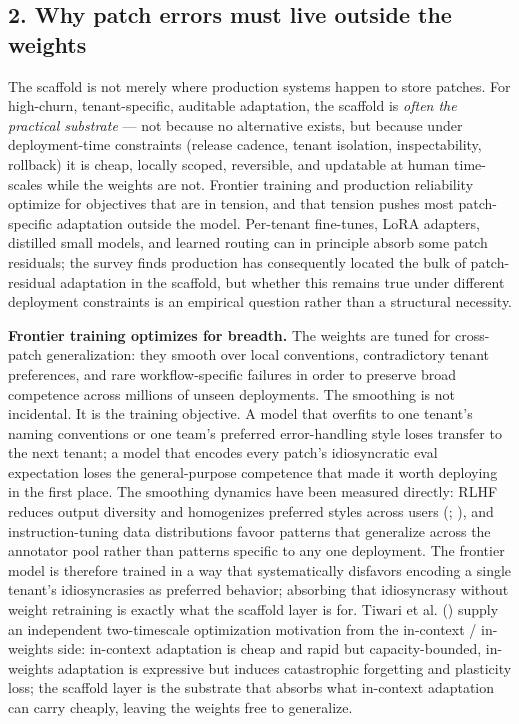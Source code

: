 \documentclass[
]{article}
\begin{document}
\subsection{2. Why patch errors must live outside the
weights}\label{why-patch-errors-must-live-outside-the-weights}

The scaffold is not merely where production systems happen to store
patches. For high-churn, tenant-specific, auditable adaptation, the
scaffold is \emph{often the practical substrate} --- not because no
alternative exists, but because under deployment-time constraints
(release cadence, tenant isolation, inspectability, rollback) it is
cheap, locally scoped, reversible, and updatable at human time-scales
while the weights are not. Frontier training and production reliability
optimize for objectives that are in tension, and that tension pushes
most patch-specific adaptation outside the model. Per-tenant fine-tunes,
LoRA adapters, distilled small models, and learned routing can in
principle absorb some patch residuals; the survey finds production has
consequently located the bulk of patch-residual adaptation in the
scaffold, but whether this remains true under different deployment
constraints is an empirical question rather than a structural necessity.

\textbf{Frontier training optimizes for breadth.} The weights are tuned
for cross-patch generalization: they smooth over local conventions,
contradictory tenant preferences, and rare workflow-specific failures in
order to preserve broad competence across millions of unseen
deployments. The smoothing is not incidental. It is the training
objective. A model that overfits to one tenant's naming conventions or
one team's preferred error-handling style loses transfer to the next
tenant; a model that encodes every patch's idiosyncratic eval
expectation loses the general-purpose competence that made it worth
deploying in the first place. The smoothing dynamics have been measured
directly: RLHF reduces output diversity and homogenizes preferred styles
across users (;
), and
instruction-tuning data distributions favoor patterns that generalize
across the annotator pool rather than patterns specific to any one
deployment. The frontier model is therefore trained in a way that
systematically disfavors encoding a single tenant's idiosyncrasies as
preferred behavior; absorbing that idiosyncrasy without weight
retraining is exactly what the scaffold layer is for. Tiwari et al.
() supply an independent
two-timescale optimization motivation from the in-context / in-weights
side: in-context adaptation is cheap and rapid but capacity-bounded,
in-weights adaptation is expressive but induces catastrophic forgetting
and plasticity loss; the scaffold layer is the substrate that absorbs
what in-context adaptation can carry cheaply, leaving the weights free
to generalize.
\end{document}
